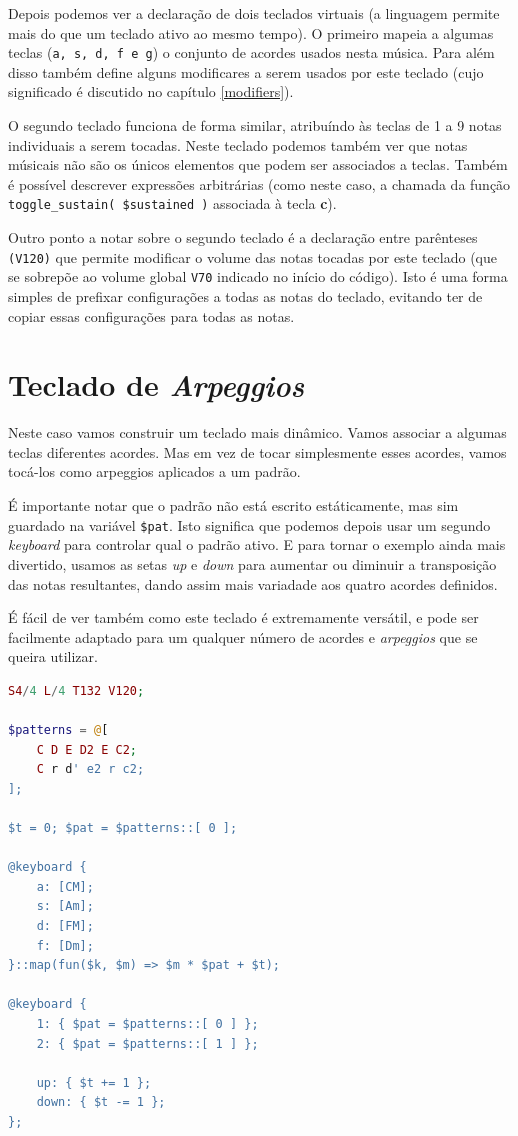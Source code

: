 Depois podemos ver a declaração de dois teclados virtuais (a linguagem permite mais do que um teclado ativo ao mesmo tempo). O primeiro mapeia a algumas teclas (\texttt{a, s, d, f e g}) o conjunto de acordes usados nesta música. Para além disso também define alguns modificares a serem usados por este teclado (cujo significado é discutido no capítulo \ref{modifiers}).

O segundo teclado funciona de forma similar, atribuíndo às teclas de 1 a 9 notas individuais a serem tocadas. Neste teclado podemos também ver que notas músicais não são os únicos elementos que podem ser associados a teclas. Também é possível descrever expressões arbitrárias (como neste caso, a chamada da função \texttt{toggle\_sustain( \$sustained )} associada à tecla \textbf{c}).

Outro ponto a notar sobre o segundo teclado é a declaração entre parênteses \texttt{(V120)} que permite modificar o volume das notas tocadas por este teclado (que se sobrepõe ao volume global \texttt{V70} indicado no início do código). Isto é uma forma simples de prefixar configurações a todas as notas do teclado, evitando ter de copiar essas configurações para todas as notas.

\section{Teclado de \textit{Arpeggios}}
Neste caso vamos construir um teclado mais dinâmico. Vamos associar a algumas teclas diferentes acordes. Mas em vez de tocar simplesmente esses acordes, vamos tocá-los como arpeggios aplicados a um padrão.

É importante notar que o padrão não está escrito estáticamente, mas sim guardado na variável \texttt{\$pat}. Isto significa que podemos depois usar um segundo \textit{keyboard} para controlar qual o padrão ativo. E para tornar o exemplo ainda mais divertido, usamos as setas \textit{up} e \textit{down} para aumentar ou diminuir a transposição das notas resultantes, dando assim mais variadade aos quatro acordes definidos.

É fácil de ver também como este teclado é extremamente versátil, e pode ser facilmente adaptado para um qualquer número de acordes e \textit{arpeggios} que se queira utilizar.

\begin{lstlisting}[caption=Definição de um teclado de acordes,language=PHP]
S4/4 L/4 T132 V120;

$patterns = @[
    C D E D2 E C2;
    C r d' e2 r c2;
];

$t = 0; $pat = $patterns::[ 0 ];

@keyboard {
    a: [CM];
    s: [Am];
    d: [FM];
    f: [Dm];
}::map(fun($k, $m) => $m * $pat + $t);

@keyboard {
    1: { $pat = $patterns::[ 0 ] };
    2: { $pat = $patterns::[ 1 ] };

    up: { $t += 1 };
    down: { $t -= 1 };
};
\end{lstlisting}

